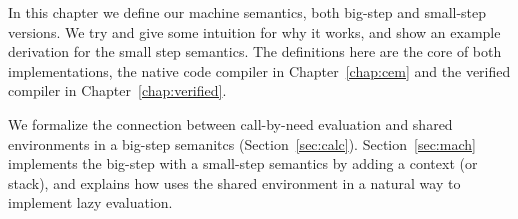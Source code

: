 In this chapter we define our \ce machine semantics, both big-step and
small-step versions. We try and give some intuition for why it works, and show
an example derivation for the small step semantics. The definitions here are the
core of both implementations, the native code compiler in Chapter~\ref{chap:cem}
and the verified compiler in Chapter~\ref{chap:verified}.

We formalize the connection between call-by-need evaluation and shared
environments in a big-step semanitcs (Section~\ref{sec:calc}).
Section~\ref{sec:mach} implements the big-step with a small-step semantics by
adding a context (or stack), and explains how \ce uses the shared environment in
a natural way to implement lazy evaluation.
